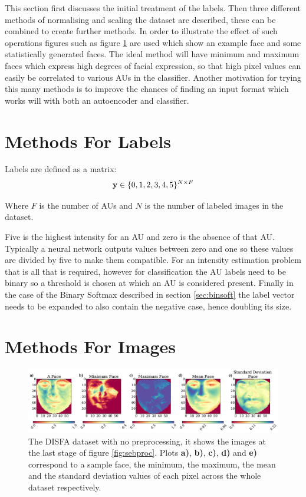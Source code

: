     This section first discusses the initial treatment of the labels.
    Then three different methods of normalising and scaling
    the dataset are described, these can be combined to create further methods. In order to illustrate
    the effect of such operations figures such as figure \ref{fig:faces_none} are used which
    show an example face and some statistically generated faces. The ideal method will
    have minimum and maximum faces which express high degrees of facial expression, so that
    high pixel values can easily be correlated to various AUs in the classifier. Another motivation
    for trying this many methods is to improve the chances of finding an input format which works will with both an
    autoencoder and classifier.

    \section{Methods For Labels}

      Labels are defined as a matrix:
      \begin{equation}
        {\bf y} \in \{0,1,2,3,4,5\}^{N\times F}
      \end{equation}

      Where $F$ is the number of AUs and $N$ is the number of labeled images
      in the dataset.

      Five is the highest intensity for an AU and zero is the absence of that AU.
      Typically a neural network outputs values between zero and one so these values are divided by five to make them compatible.
      For an intensity estimation problem that is all that is required, however for classification
      the AU labels need to be binary so a threshold is chosen at which an AU is considered present.
      Finally in the case of the Binary Softmax described in section \ref{sec:binsoft} the label vector
      needs to be expanded to also contain the negative case, hence doubling its size.

  \section{Methods For Images} \label{sec:methods}

    \begin{figure}[!h] \centering
    \includegraphics[width =\hsize]{figures/faces.pdf}
    \caption{The DISFA dataset with no preprocessing, it shows
    the images at the last stage of figure \ref{fig:sebproc}.
    Plots {\bf a)}, {\bf b)}, {\bf c)}, {\bf d)} and {\bf e)}
    correspond to a sample face, the minimum, the maximum,
    the mean and the standard deviation values of each pixel across
    the whole dataset respectively.}
    \label{fig:faces_none} \end{figure}

